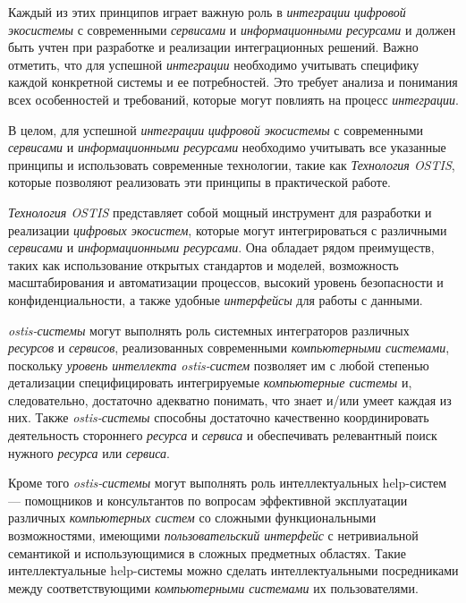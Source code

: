Каждый из этих принципов играет важную роль в \textit{интеграции} \textit{цифровой экосистемы} с современными \textit{сервисами} и \textit{информационными ресурсами} и должен быть учтен при разработке и реализации интеграционных решений. Важно отметить, что для успешной \textit{интеграции} необходимо учитывать специфику каждой конкретной системы и ее потребностей. Это требует анализа и понимания всех особенностей и требований, которые могут повлиять на процесс \textit{интеграции}.

В целом, для успешной \textit{интеграции} \textit{цифровой экосистемы} с современными \textit{сервисами} и \textit{информационными ресурсами} необходимо учитывать все указанные принципы и использовать современные технологии, такие как \textit{Технология OSTIS}, которые позволяют реализовать эти принципы в практической работе.

\textit{Технология OSTIS} представляет собой мощный инструмент для разработки и реализации \textit{цифровых экосистем}, которые могут интегрироваться с различными \textit{сервисами} и \textit{информационными ресурсами}. Она обладает рядом преимуществ, таких как использование открытых стандартов и моделей, возможность масштабирования и автоматизации процессов, высокий уровень безопасности и конфиденциальности, а также удобные \textit{интерфейсы} для работы с данными.

\textit{ostis-системы} могут выполнять роль системных интеграторов различных \textit{ресурсов} и \textit{сервисов}, реализованных современными \textit{компьютерными системами}, поскольку \textit{уровень интеллекта} \textit{ostis-систем} позволяет им с любой степенью детализации специфицировать интегрируемые \textit{компьютерные системы} и, следовательно, достаточно адекватно понимать, что знает и/или умеет каждая из них. Также \textit{ostis-системы} способны достаточно качественно координировать деятельность стороннего \textit{ресурса} и \textit{сервиса} и обеспечивать релевантный поиск нужного \textit{ресурса} или \textit{сервиса}.

Кроме того \textit{ostis-системы} могут выполнять роль интеллектуальных help-систем --- помощников и консультантов по вопросам эффективной эксплуатации различных \textit{компьютерных систем} со сложными функциональными возможностями, имеющими \textit{пользовательский интерфейс} с нетривиальной семантикой и использующимися в сложных предметных областях. 
Такие интеллектуальные help-системы можно сделать интеллектуальными посредниками между соответствующими \textit{компьютерными системами} их пользователями.

